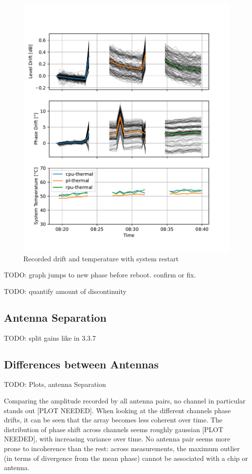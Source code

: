 \begin{figure}
    \centering
    \includegraphics[width=\textwidth]{../figures/meas_23-10-30_reboots_phase_drift.pdf}
    \caption{Recorded drift and temperature with system restart}
    \label{fig:restart}
\end{figure}

TODO: graph jumps to new phase before reboot. confirm or fix.

TODO: quantify amount of discontinuity


\subsection{Antenna Separation}
TODO: split gains like in 3.3.7

\subsection{Differences between Antennas}
TODO: Plots, antenna Separation

Comparing the amplitude recorded by all antenna pairs, no channel in particular stands out [PLOT NEEDED].
When looking at the different channels phase drifts, it can be seen that the array becomes less coherent over time.
The distribution of phase shift across channels seems roughly gaussian [PLOT NEEDED], with increasing variance over time.
No antenna pair seems more prone to incoherence than the rest:
across measurements, the maximum outlier (in terms of divergence from the mean phase) cannot be associated with a chip or antenna.

